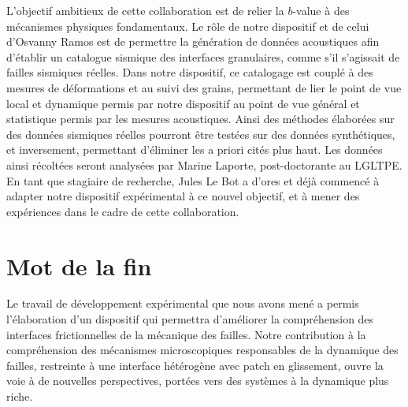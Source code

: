 L'objectif ambitieux de cette collaboration est de relier la $b$-value à des mécanismes physiques fondamentaux. Le rôle de notre dispositif et de celui d'Osvanny Ramos est de permettre la génération de données acoustiques afin d'établir un catalogue sismique des interfaces granulaires, comme s'il s'agissait de failles sismiques réelles. Dans notre dispositif, ce catalogage est couplé à des mesures de déformations et au suivi des grains, permettant de lier le point de vue local et dynamique permis par notre dispositif au point de vue général et statistique permis par les mesures acoustiques. Ainsi des méthodes élaborées sur des données sismiques réelles pourront être testées sur des données synthétiques, et inversement, permettant d'éliminer les a priori cités plus haut. Les données ainsi récoltées seront analysées par Marine Laporte, post-doctorante au LGLTPE. En tant que stagiaire de recherche, Jules Le Bot a d'ores et déjà commencé à adapter notre dispositif expérimental à ce nouvel objectif, et à mener des expériences dans le cadre de cette collaboration.





\section{Mot de la fin}

Le travail de développement expérimental que nous avons mené a permis l'élaboration d'un dispositif qui permettra d'améliorer la compréhension des interfaces frictionnelles de la mécanique des failles. Notre contribution à la compréhension des mécanismes microscopiques responsables de la dynamique des failles, restreinte à une interface hétérogène avec patch en glissement, ouvre la voie à de nouvelles perspectives, portées vers des systèmes à la dynamique plus riche.











